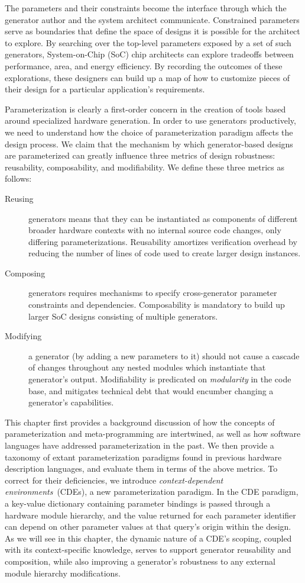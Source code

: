 The parameters and their constraints become the interface through which the generator author and the system architect communicate.
Constrained parameters serve as boundaries that define the space of designs it is possible for the architect to explore.
By searching over the top-level parameters exposed by a set of such generators, System-on-Chip (SoC) chip architects can explore tradeoffs between performance, area, and energy efficiency.
By recording the outcomes of these explorations, these designers can build up a map of how to customize pieces of their design for a particular application's requirements.

Parameterization is clearly a first-order concern in the creation of tools based around specialized hardware generation.
In order to use generators productively, we need to understand how the choice of parameterization paradigm affects the design process.
We claim that the mechanism by which generator-based designs are parameterized can greatly influence three metrics of design robustness: reusability, composability, and modifiability.
We define these three metrics as follows:
\begin{description}
\item[Reusing] generators means that they can be instantiated as components of different broader hardware contexts with no internal source code changes, only differing parameterizations. Reusability amortizes verification overhead by reducing the number of lines of code used to create larger design instances.
\item[Composing] generators requires mechanisms to specify cross-generator parameter constraints and dependencies. Composability is mandatory to build up larger SoC designs consisting of multiple generators.
\item[Modifying] a generator (by adding a new parameters to it) should not cause a cascade of changes throughout any nested modules which instantiate that generator's output. Modifiability is predicated on \emph{modularity} in the code base, and mitigates technical debt that would encumber changing a generator's capabilities.
\end{description}

This chapter first provides a background discussion of how the concepts of parameterization and meta-programming are intertwined, as well as how software languages have addressed parameterization in the past.
We then provide a taxonomy of extant parameterization paradigms found in previous hardware description languages, and evaluate them in terms of the above metrics.
To correct for their deficiencies, we introduce \emph{context-dependent environments}~(CDEs), a new parameterization paradigm.
In the CDE paradigm, a key-value dictionary containing parameter bindings is passed through a hardware module hierarchy, and the value returned for each parameter identifier can depend on other parameter values at that query's origin within the design.
As we will see in this chapter,
the dynamic nature of a CDE's scoping, coupled with its context-specific knowledge, 
serves to support generator reusability and composition, while also improving a generator's robustness to any external module hierarchy modifications.

